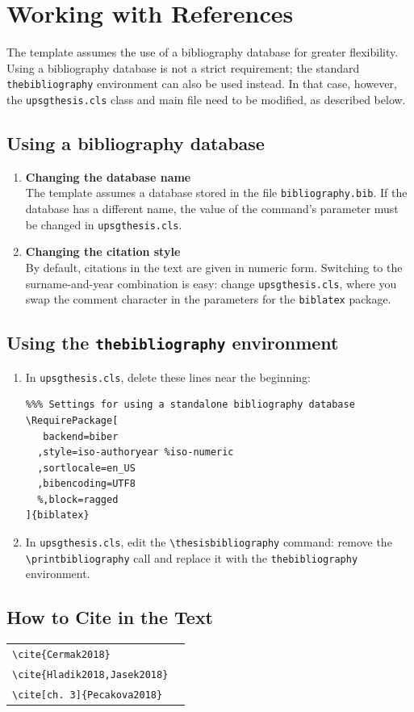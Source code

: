 
\chapter{Working with References}

The template assumes the use of a bibliography database for greater flexibility. Using a bibliography database is not a strict requirement; the standard \texttt{thebibliography} environment can also be used instead. In that case, however, the \texttt{upsgthesis.cls} class and main file need to be modified, as described below.

\section{Using a bibliography database}

\begin{enumerate}
\item\textbf{Changing the database name}\\
The template assumes a database stored in the file \texttt{bibliography.bib}. If the database has a different name, the value of the \verb'' command's parameter must be changed in \texttt{upsgthesis.cls}.
\item\textbf{Changing the citation style}\\
By default, citations in the text are given in numeric form. Switching to the surname-and-year combination is easy: change \texttt{upsgthesis.cls}, where you swap the comment character in the parameters for the \texttt{biblatex} package.
\end{enumerate}


\section{Using the \texttt{thebibliography} environment}
\begin{enumerate}
\item In \texttt{upsgthesis.cls}, delete these lines near the beginning:
\begin{verbatim}
%%% Settings for using a standalone bibliography database
\RequirePackage[
   backend=biber
  ,style=iso-authoryear %iso-numeric
  ,sortlocale=en_US
  ,bibencoding=UTF8
  %,block=ragged
]{biblatex}

\end{verbatim}
\item In \texttt{upsgthesis.cls}, edit the \verb'\thesisbibliography' command: remove the \verb'\printbibliography' call and replace it with the \texttt{thebibliography} environment.
\end{enumerate}


\section{How to Cite in the Text}
\begin{center}
\begin{tabular}{l@{~~$\longrightarrow$~~}l}
\verb|\cite{Cermak2018}|&\cite{Cermak2018}\\
\verb|\cite{Hladik2018,Jasek2018}|&\cite{Hladik2018,Jasek2018}\\
\verb|\cite[ch. 3]{Pecakova2018}|&\cite[ch. 3]{Pecakova2018}\\
\end{tabular}
\end{center}
